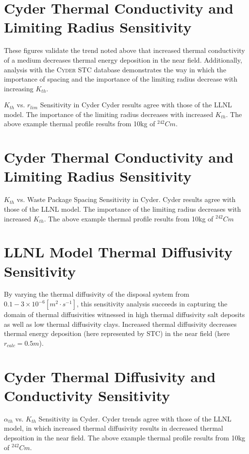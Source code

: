 \documentclass[letterpaper]{article}
\newcommand{\Cyder}{\textsc{Cyder}\xspace}
\begin{document}
{\section{Cyder Thermal Conductivity and Limiting Radius Sensitivity}

These figures validate the trend noted above that 
increased thermal conductivity of a medium decreases thermal energy deposition 
in the near field. Additionally, analysis with the \Cyder STC database 
demonstrates the way in which the importance of spacing and the importance of 
the limiting radius decrease with increasing $K_{th}$.

$K_{th}$ vs. $r_{lim}$ Sensitivity in Cyder
Cyder results agree with 
those of the LLNL model. The importance of the limiting radius decreases with 
increased $K_{th}$. The above example thermal profile results from 10kg of 
$^{242}Cm$.

\section{Cyder Thermal Conductivity and Limiting Radius Sensitivity}

$K_{th}$ vs. Waste Package Spacing Sensitivity in Cyder.
Cyder results 
agree with 
those of the LLNL model. The importance of the limiting radius decreases with 
increased $K_{th}$. The above example thermal profile results from 10kg of 
$^{242}Cm$




\section{LLNL Model Thermal Diffusivity Sensitivity}
  By varying the thermal diffusivity of the disposal system from $0.1-3\times 
  10^{-6} [m^2\cdot s^{-1}]$, this sensitivity analysis succeeds in capturing 
  the domain of 
  thermal diffusivities witnessed in high thermal diffusivity salt deposits as 
  well as low thermal diffusivity clays.
    Increased thermal diffusivity decreases thermal energy deposition (here represented by STC) in the near field (here $r_{calc} = 0.5m$).


\section{Cyder Thermal Diffusivity and Conductivity Sensitivity}
$\alpha_{th}$ vs. $K_{th}$ Sensitivity in Cyder. Cyder trends agree
  with those of the LLNL model, in which increased thermal diffusivity results 
  in 
  decreased thermal depsoition in the near field. The above example thermal 
  profile results from 10kg of $^{242}Cm$.

}
\end{document}
